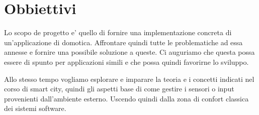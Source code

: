 \section{Obbiettivi}

Lo scopo de progetto e' quello di fornire una implementazione concreta di un'applicazione di domotica. Affrontare quindi tutte le problematiche ad essa annesse e fornire una possibile soluzione a queste. Ci auguriamo che questa possa essere di spunto per applicazioni simili e che possa quindi favorirne lo sviluppo.

Allo stesso tempo vogliamo esplorare e imparare la teoria e i concetti indicati nel corso di smart city, quindi gli aspetti base di come gestire i sensori o input provenienti dall'ambiente esterno. Uscendo quindi dalla zona di confort classica dei sistemi software.


\newpage


